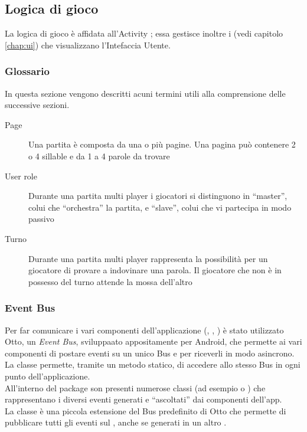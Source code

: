 


\subsection{Logica di gioco}

\label{chap:game_logic}

La logica di gioco è affidata all'Activity ; essa gestisce inoltre i  (vedi capitolo \ref{chap:ui}) che visualizzano l'Intefaccia Utente.

\subsubsection{Glossario}
\label{sec:glossary}
In questa sezione vengono descritti acuni termini utili alla comprensione delle successive sezioni.

\begin{description}
\item[Page] Una partita è composta da una o più pagine. Una pagina può contenere 2 o 4 sillable e da 1 a 4 parole da trovare
\item[User role] Durante una partita multi player i giocatori si distinguono in ``master'', colui che ``orchestra'' la partita, e ``slave'', colui che vi partecipa in modo passivo 
\item[Turno] Durante una partita multi player rappresenta la possibilità per un giocatore di provare a indovinare una parola. Il giocatore che non è in possesso del turno attende la mossa dell'altro
\end{description}

\subsubsection{Event Bus}
\label{sec:event_bus}
Per far comunicare i vari componenti dell'applicazione (, , ) è stato utilizzato Otto, un \textit{Event Bus}, sviluppaato appositamente per Android, che permette ai vari componenti di postare eventi su un unico Bus e per riceverli in modo asincrono.\\
La classe  permette, tramite un metodo statico, di accedere allo stesso Bus in ogni punto dell'applicazione.\\
All'interno del package  son presenti numerose classi (ad esempio  o ) che rappresentano i diversi eventi generati e ``ascoltati'' dai componenti dell'app.\\
La classe  è una piccola estensione del Bus predefinito di Otto che permette di pubblicare tutti gli eventi sul , anche se generati in un altro .

